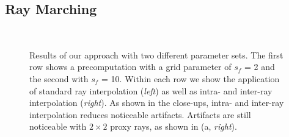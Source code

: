 \documentclass[journal]{vgtc}                %
\begin{document}
\subsection{Ray Marching}
\begin{figure}[t]
    \centering
    \\
    \caption{Results of our approach with two different parameter sets. The first row shows a precomputation with a grid parameter of $s_f$ = 2 and the second with $s_f$ = 10. Within each row we show the application of standard ray interpolation ({\it left}) as well as intra- and inter-ray interpolation ({\it right}). As shown in the close-ups, intra- and inter-ray interpolation reduces noticeable artifacts. Artifacts are still noticeable with $2 \times 2$ proxy rays, as shown in ({a, \it right}).}
    \label{fig:rayinterpolation}
\end{figure}
\end{document}
